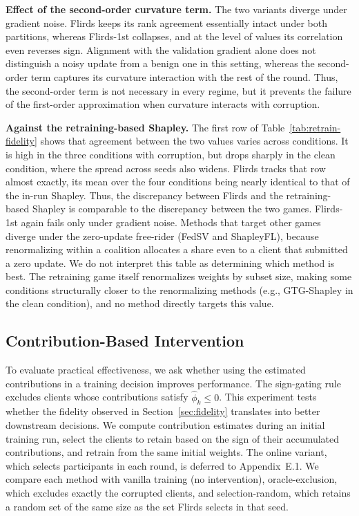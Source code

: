 \documentclass[letterpaper]{article} %
\theoremstyle{definition} %
\begin{document}
\noindent\textbf{Effect of the second-order curvature term.}
The two variants diverge
under gradient noise. Flirds keeps its rank agreement essentially intact under
both partitions, whereas Flirds-1st collapses, and at the level of values its
correlation even reverses sign.
Alignment with the validation gradient alone does not
distinguish a noisy update from a benign one in this setting, whereas the second-order
term captures its curvature interaction with the rest of the round. Thus, the second-order term is
not necessary in every regime, but it prevents the failure of the first-order
approximation when curvature interacts with corruption.

\noindent\textbf{Against the retraining-based Shapley.}
The first row of Table~\ref{tab:retrain-fidelity} shows that agreement between
the two values varies across conditions. It is high in the three conditions
with corruption, but drops sharply in the clean condition, where the spread across
seeds also widens. Flirds tracks that row almost exactly, its mean over the
four conditions being nearly identical to that of the in-run Shapley. Thus, the discrepancy between Flirds and the retraining-based Shapley is comparable to the discrepancy between the two
games. Flirds-1st again fails only under gradient noise. Methods
that target other games diverge under the zero-update free-rider (FedSV and
ShapleyFL), because renormalizing within a coalition allocates a share even to a client that
submitted a zero update. We do not interpret this table as determining which
method is best. The retraining game itself renormalizes weights by subset
size, making some conditions structurally closer to the renormalizing methods (e.g., GTG-Shapley in the clean condition), and no method directly targets
this value.

\subsection{Contribution-Based Intervention}
\label{sec:intervention}

To evaluate practical effectiveness, we ask whether using the estimated
contributions in a training decision improves performance. The sign-gating
rule excludes clients whose contributions satisfy $\hat\phi_k \le 0$. This
experiment tests whether the fidelity observed in Section~\ref{sec:fidelity}
translates into better downstream decisions. We compute contribution estimates during an initial training run, select the
clients to retain based on the sign of their accumulated contributions, and
retrain from the same initial weights. The online variant, which selects
participants in each round, is deferred to Appendix~E.1. We compare each method with vanilla training (no intervention),
oracle-exclusion, which excludes exactly the corrupted clients, and
selection-random, which retains a random set of the same size as the set
Flirds selects in that seed.
\end{document}
